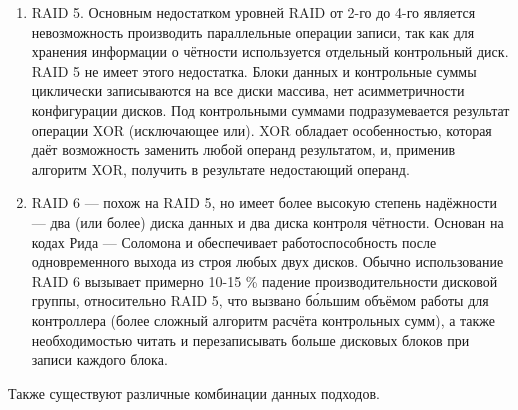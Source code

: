 \begin{enumerate}
\begin{enumerate}
         \item RAID 5. Основным недостатком уровней RAID от 2-го до 4-го является невозможность производить параллельные операции записи, так как для хранения информации о чётности используется отдельный контрольный диск. RAID 5 не имеет этого недостатка. Блоки данных и контрольные суммы циклически записываются на все диски массива, нет асимметричности конфигурации дисков. Под контрольными суммами подразумевается результат операции XOR (исключающее или). XOR обладает особенностью, которая даёт возможность заменить любой операнд результатом, и, применив алгоритм XOR, получить в результате недостающий операнд.
         \item RAID 6 — похож на RAID 5, но имеет более высокую степень надёжности — два (или более) диска данных и два диска контроля чётности. Основан на кодах Рида — Соломона и обеспечивает работоспособность после одновременного выхода из строя любых двух дисков. Обычно использование RAID 6 вызывает примерно 10-15 \% падение производительности дисковой группы, относительно RAID 5, что вызвано б\'{о}льшим объёмом работы для контроллера (более сложный алгоритм расчёта контрольных сумм), а также необходимостью читать и перезаписывать больше дисковых блоков при записи каждого блока.
     \end{enumerate}
     Также существуют различные комбинации данных подходов.
\end{enumerate}
